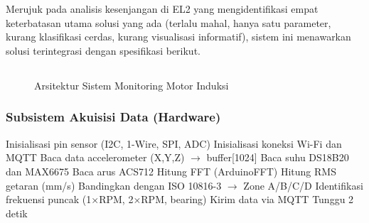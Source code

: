 \documentclass{elsinta}
\begin{document}
\section{\ProposedSolutionTitle}

Merujuk pada analisis kesenjangan di EL2 yang mengidentifikasi empat keterbatasan utama solusi yang ada (terlalu mahal, hanya satu parameter, kurang klasifikasi cerdas, kurang visualisasi informatif), sistem ini menawarkan solusi terintegrasi dengan spesifikasi berikut.

\subsection{\ArchitectureTitle}

\begin{figure}[H]
    \centering
    \caption{Arsitektur Sistem Monitoring Motor Induksi}
    \label{fig:architecture}
\end{figure}

\subsubsection{Subsistem Akuisisi Data (Hardware)}

\begin{algorithm}[H]
\caption{Algoritma Akuisisi Data dan FFT}
\label{alg:acquisition}
\begin{algorithmic}[1]
\STATE Inisialisasi pin sensor (I2C, 1-Wire, SPI, ADC)
\STATE Inisialisasi koneksi Wi-Fi dan MQTT
    \STATE Baca data accelerometer (X,Y,Z) $\rightarrow$ buffer[1024]
    \STATE Baca suhu DS18B20 dan MAX6675
    \STATE Baca arus ACS712
        \STATE Hitung FFT (ArduinoFFT)
        \STATE Hitung RMS getaran (mm/s)
        \STATE Bandingkan dengan ISO 10816-3 $\rightarrow$ Zone A/B/C/D
        \STATE Identifikasi frekuensi puncak (1×RPM, 2×RPM, bearing)
        \STATE Kirim data via MQTT
    \ENDIF
    \STATE Tunggu 2 detik
\ENDWHILE
\end{algorithmic}
\end{algorithm}
\end{document}
